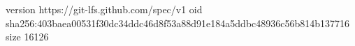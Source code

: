 version https://git-lfs.github.com/spec/v1
oid sha256:403baea00531f30dc34ddc46d8f53a88d91e184a5ddbc48936c56b814b137716
size 16126

